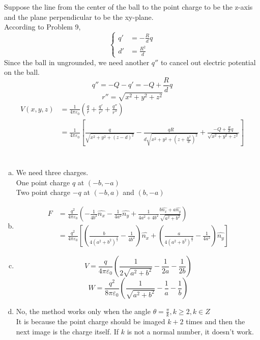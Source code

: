 \documentclass{article}
\begin{document}
\section{}
Suppose the line from the center of the ball to the point charge to be the z-axis and the plane perpendicular to be the xy-plane.\\
According to Problem 9,
\begin{equation*}
\left\lbrace
\begin{array}{cc}
q'&=-\frac{R}{d}q\\
d'&=\frac{R^2}{d}
\end{array}
\right.
\end{equation*}
Since the ball in ungrounded, we need another $q''$ to cancel out electric potential on the ball.
$$q''=-Q-q'=-Q+\frac{R}{d}q$$
$$r''=\sqrt{x^2+y^2+z^2}$$
\begin{align*}
V(x,y,z)&=\frac{1}{4\pi\varepsilon_0}\left(\frac{q}{r}+\frac{q'}{r'}+\frac{q''}{r''}\right)\\
&=\frac{1}{4\pi\varepsilon_0}\left[\frac{q}{\sqrt{x^2+y^2+(z-d)^2}}-\frac{qR}{d\sqrt{x^2+y^2+(z+\frac{R^2}{d})^2}}+\frac{-Q+\frac{R}{d}q}{\sqrt{x^2+y^2+z^2}}\right]
\end{align*}

\section{}
\begin{enumerate}[(a)]
\item
We need three charges.\\
One point charge $q$ at $(-b,-a)$\\
Two point charge $-q$ at $(-b,a)$ and $(b,-a)$
\item
\begin{align*}
F&=\frac{q^2}{4\pi\varepsilon_0}\left(-\frac{1}{4b^2}\hat{n_x}-\frac{1}{4a^2}\hat{n_y}+\frac{1}{4a^2+4b^2}\frac{b\hat{n_x}+a\hat{n_y}}{\sqrt{a^2+b^2}}\right)\\
&=\frac{q^2}{4\pi\varepsilon_0}\left[\left(\frac{b}{4(a^2+b^2)^{\frac{3}{2}}}-\frac{1}{4b^2}\right)\hat{n_x}+\left(\frac{a}{4(a^2+b^2)^{\frac{3}{2}}}-\frac{1}{4a^2}\right)\hat{n_y}\right]
\end{align*}
\item
$$V=\frac{q}{4\pi\varepsilon_0}\left(\frac{1}{2\sqrt{a^2+b^2}}-\frac{1}{2a}-\frac{1}{2b}\right)$$
$$W=\frac{q^2}{8\pi\varepsilon_0}\left(\frac{1}{\sqrt{a^2+b^2}}-\frac{1}{a}-\frac{1}{b}\right)$$
\item
No, the method works only when the angle $\theta=\frac{\pi}{k},k\geq2,k\in Z$\\
It is because the point charge should be imaged $k+2$ times and then the next image is the charge itself. If $k$ is not a normal number, it doesn't work.
\end{enumerate}
\end{document}
